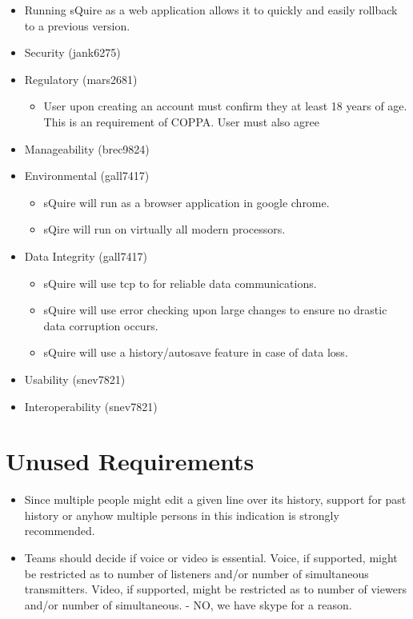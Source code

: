 \documentclass[11pt]{report}
\begin{document}
\begin{itemize}
            \item Running sQuire as a web application allows it to quickly and easily rollback to a previous version.  
        \item Security (jank6275)
        \item Regulatory (mars2681) \begin{itemize}
            \item User upon creating an account must confirm they at least 18 years of age. This is an requirement of COPPA. User must also agree \end{itemize}
        \item Manageability (brec9824)
        \item Environmental (gall7417) \begin{itemize}
            \item sQuire will run as a browser application in google chrome.
            \item sQire will run on virtually all modern processors.\end{itemize}
        \item Data Integrity (gall7417) \begin{itemize}
            \item sQuire will use tcp to for reliable data communications.
            \item sQuire will use error checking upon large changes to ensure no drastic data corruption occurs.
            \item sQuire will use a history/autosave feature in case of data loss.\end{itemize}
        \item Usability (snev7821)
        \item Interoperability (snev7821)
    \end{itemize}

\section{Unused Requirements}
    \begin{itemize}
        \item Since multiple people might edit a given line over its history, support for past history or anyhow multiple persons in this indication is strongly recommended.
        \item Teams should decide if voice or video is essential. Voice, if supported, might be restricted as to number of listeners and/or number of simultaneous transmitters. Video, if supported, might be restricted as to number of viewers and/or number of simultaneous. - NO, we have skype for a reason.
    \end{itemize}
    
\end{document}
